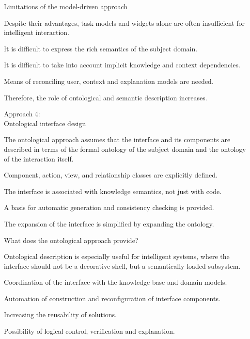 \begin{frame}{Limitations of the model-driven approach}
	\topline
	\justifying
	
	Despite their advantages, task models and widgets alone are often insufficient for intelligent interaction.
	
	\begin{textitemize}
		\item It is difficult to express the rich semantics of the subject domain.
		\item It is difficult to take into account implicit knowledge and context dependencies.
		\item Means of reconciling user, context and explanation models are needed.
		\item Therefore, the role of ontological and semantic description increases.
	\end{textitemize}
\end{frame}

\begin{frame}{Approach 4:\\ Ontological interface design}
	\topline
	\justifying
	
	The ontological approach assumes that the interface and its components are described in terms of the formal ontology of the subject domain and the ontology of the interaction itself.
	
	\begin{textitemize}
		\item Component, action, view, and relationship classes are explicitly defined.
		\item The interface is associated with knowledge semantics, not just with code.
		\item A basis for automatic generation and consistency checking is provided.
		\item The expansion of the interface is simplified by expanding the ontology.
	\end{textitemize}
\end{frame}

\begin{frame}{What does the ontological approach provide?}
	\topline
	\justifying
	
	Ontological description is especially useful for intelligent systems, where the interface should not be a decorative shell, but a semantically loaded subsystem.
	
	\begin{textitemize}
		\item Coordination of the interface with the knowledge base and domain models.
		\item Automation of construction and reconfiguration of interface components.
		\item Increasing the reusability of solutions.
		\item Possibility of logical control, verification and explanation.
	\end{textitemize}
\end{frame}

